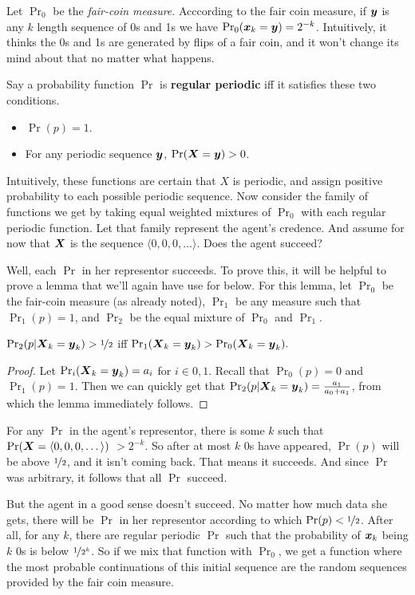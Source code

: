 Let $\Pr_0$ be the \textit{fair-coin measure}. Acccording to the fair coin measure, if $\boldsymbol{y}$ is  any $k$ length sequence of 0s and 1s we have $\Pr_0(\boldsymbol{x}_k = \boldsymbol{y}) = 2^{-k}$. Intuitively, it thinks the 0s and 1s are generated by flips of a fair coin, and it won't change its mind about that no matter what happens.

Say a probability function $\Pr$ is \textbf{regular periodic} iff it satisfies these two conditions.
\begin{itemize}
\item $\Pr(p) = 1$.
\item For any periodic sequence $\boldsymbol{y}$, $\Pr(\boldsymbol{X} = \boldsymbol{y}) > 0$.
\end{itemize}
%
Intuitively, these functions are certain that $X$ is periodic, and assign positive probability to each possible periodic sequence. Now consider the family of functions we get by taking equal weighted mixtures of $\Pr_0$ with each regular periodic function. Let that family represent the agent's credence. And assume for now that $\boldsymbol{X}$ is the sequence $\langle 0, 0, 0, \dots \rangle$. Does the agent succeed?\label{FailureExample}

Well, each $\Pr$ in her representor succeeds. To prove this, it will be helpful to prove a lemma that we'll again have use for below. For this lemma, let $\Pr_0$ be the fair-coin measure (as already noted), $\Pr_1$ be any measure such that $\Pr_1(p) = 1$, and $\Pr_2$ be the equal mixture of $\Pr_0$ and $\Pr_1$.

\begin{lemma}
\label{Half}
$\Pr_2(p | \boldsymbol{X}_k = \boldsymbol{y}_k) > \nicefrac{1}{2}$ iff $\Pr_1(\boldsymbol{X}_k = \boldsymbol{y}_k) > \Pr_0(\boldsymbol{X}_k = \boldsymbol{y}_k).$
\end{lemma}
\begin{proof}
Let $\Pr_i(\boldsymbol{X}_k = \boldsymbol{y}_k) = a_i$ for $i \in {0, 1}$. Recall that $\Pr_0(p) = 0$ and $\Pr_1(p) = 1$. Then we can quickly get that $\Pr_2(p | \boldsymbol{X}_k = \boldsymbol{y}_k) = \frac{a_1}{a_0 + a_1}$, from which the lemma immediately follows. 
\end{proof}

For any $\Pr$ in the agent's representor, there is some $k$ such that $\Pr(\boldsymbol{X} = \langle 0, 0, 0, \dots \rangle)$ $> 2^{-k}$. So after at most $k$ 0s have appeared, $\Pr(p)$ will be above $\nicefrac{1}{2}$, and it isn't coming back. That means it succeeds. And since $\Pr$ was arbitrary, it follows that all $\Pr$ succeed.

But the agent in a good sense doesn't succeed. No matter how much data she gets, there will be $\Pr$ in her representor according to which $\Pr(p) < \nicefrac{1}{2}$. After all, for any $k$, there are regular periodic $\Pr$ such that the probability of $\boldsymbol{x}_k$ being $k$ 0s is below $\nicefrac{1}{2^k}$. So if we mix that function with $\Pr_0$, we get a function where the most probable continuations of this initial sequence are the random sequences provided by the fair coin measure.

